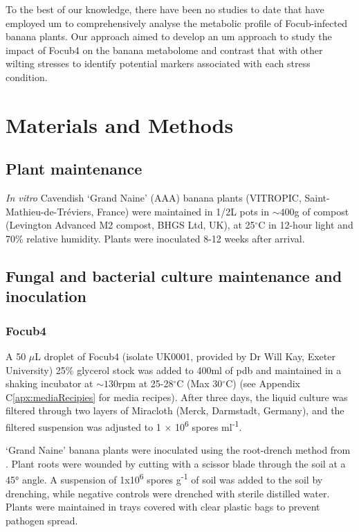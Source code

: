To the best of our knowledge, there have been no studies to date that have employed \ac{um} to comprehensively analyse the metabolic profile of \ac{Focub}-infected banana plants. Our approach aimed to develop an \ac{um} approach to study the impact of \ac{Focub4} on the banana metabolome and contrast that with other wilting stresses to identify potential markers associated with each stress condition. 

\newpage
\section{Materials and Methods}
\label{sec:Chapter4_MM}

\subsection{Plant maintenance}
\textit{In vitro} Cavendish ‘Grand Naine’ (AAA) banana plants (VITROPIC, Saint-Mathieu-de-Tréviers, France) were maintained in 1/2L pots in $\sim400$g of compost (Levington Advanced M2 compost, BHGS Ltd, UK), at 25$^{\circ}$C in 12-hour light and 70\% relative humidity. Plants were inoculated 8-12 weeks after arrival. 

\subsection{Fungal and bacterial culture maintenance and inoculation}

\subsubsection{\acl{Focub4}}
A 50 \(\mu\)L droplet of \acl{Focub4} (isolate UK0001, provided by Dr Will Kay, Exeter University) 25\% glycerol stock was added to 400ml of \acf{pdb} and maintained in a shaking incubator at $\sim130$rpm at 25-28$^{\circ}$C (Max 30$^{\circ}$C) (see Appendix C\ref{apx:mediaRecipies} for media recipes). After three days, the liquid culture was filtered through two layers of Miracloth (Merck, Darmstadt, Germany), and the filtered suspension was adjusted to 1 × 10\textsuperscript{6} spores ml\textsuperscript{-1}.

‘Grand Naine’ banana plants were inoculated using the root-drench method from \textcite{Garcia-Bastidas2019}. Plant roots were wounded by cutting with a scissor blade through the soil at a 45° angle. A suspension of 1x10\textsuperscript{6} spores g\textsuperscript{-1} of soil was added to the soil by drenching, while negative controls were drenched with sterile distilled water. Plants were maintained in trays covered with clear plastic bags to prevent pathogen spread. 

